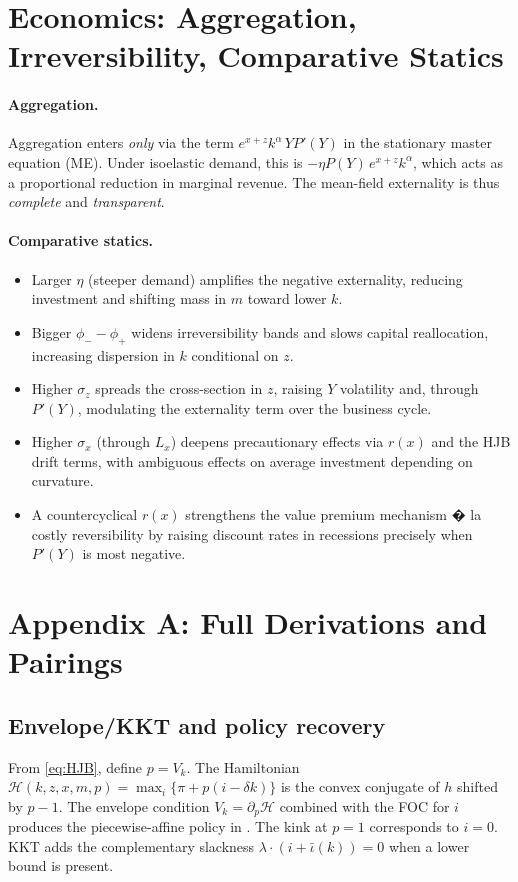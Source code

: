﻿\documentclass[11pt,letterpaper,oneside]{article}
\numberwithin{equation}{section}
\newcommand{\1}{\mathbf{1}}
\newcommand{\Lx}{L_x}
\newcommand{\kbar}{\bar\iota}
\begin{document}
\section{Economics: Aggregation, Irreversibility, Comparative Statics}

\paragraph{Aggregation.}
Aggregation enters \emph{only} via the term $e^{x+z}k^\alpha\,Y P'(Y)$ in the stationary master equation (ME). Under isoelastic demand, this is $-\eta P(Y)\,e^{x+z}k^\alpha$, which acts as a proportional reduction in marginal revenue. The mean-field externality is thus \emph{complete} and \emph{transparent}.
 

\paragraph{Comparative statics.}
\begin{itemize}[leftmargin=1.25em]
\item Larger $\eta$ (steeper demand) amplifies the negative externality, reducing investment and shifting mass in $m$ toward lower $k$.
\item Bigger $\phi_- - \phi_+$ widens irreversibility bands and slows capital reallocation, increasing dispersion in $k$ conditional on $z$.
\item Higher $\sigma_z$ spreads the cross-section in $z$, raising $Y$ volatility and, through $P'(Y)$, modulating the externality term over the business cycle.
\item Higher $\sigma_x$ (through $\Lx$) deepens precautionary effects via $r(x)$ and the HJB drift terms, with ambiguous effects on average investment depending on curvature.
\item A countercyclical $r(x)$ strengthens the value premium mechanism � la costly reversibility by raising discount rates in recessions precisely when $P'(Y)$ is most negative.
\end{itemize}

\appendix
\section{Appendix A: Full Derivations and Pairings}\label{app:derivations}

\subsection{Envelope/KKT and policy recovery}
From \eqref{eq:HJB}, define $p=V_k$. The Hamiltonian
$\mathcal{H}(k,z,x,m,p)=\max_i\{\pi+p(i-\delta k)\}$
is the convex conjugate of $h$ shifted by $p-1$. The envelope condition $V_k=\partial_p \mathcal{H}$ combined with the FOC for $i$ produces the piecewise-affine policy in . The kink at $p=1$ corresponds to $i=0$. KKT adds the complementary slackness $\lambda\cdot(i+\kbar(k))=0$ when a lower bound is present.
\end{document}
